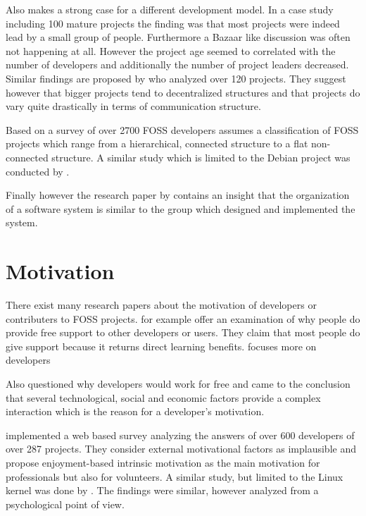 Also \textcite{Krishnamurthy2002} makes a strong case for a different
development model. In a case study including 100 mature projects the finding
was that most projects were indeed lead by a small group of people. Furthermore
a Bazaar like discussion was often not happening at all. However the project
age seemed to correlated with the number of developers and additionally the
number of project leaders decreased. Similar findings are proposed by
\textcite{Crowston2005a} who analyzed over 120 projects. They suggest however
that bigger projects tend to decentralized structures and that projects do vary
quite drastically in terms of communication structure.

Based on a survey of over 2700 \ac{FOSS} developers \textcite{Ghosh2005}
assumes a classification of \ac{FOSS} projects which range from a hierarchical,
connected structure to a flat non-connected structure. A similar study which is
limited to the Debian project was conducted by \textcite{Sadowski2008}.

Finally however the research paper by \textcite{Conway1968} contains an insight
that the organization of a software system is similar to the group which
designed and implemented the system.


\section{Motivation} %

There exist many research papers about the motivation of developers or
contributers to \ac{FOSS} projects. \textcite{Lakhani2002} for example offer an
examination of why people do provide free support to other developers or users.
They claim that most people do give support because it returns direct learning
benefits. \textcite{Lerner2000} focuses more on developers 

Also \textcite{Grazzini2009} questioned why developers would work for free and
came to the conclusion that several technological, social and economic factors
provide a complex interaction which is the reason for a developer's motivation.

\textcite{Lakhani2003} implemented a web based survey analyzing the answers of
over 600 developers of over 287 projects. They consider external motivational
factors as implausible and propose enjoyment-based intrinsic motivation as the
main motivation for professionals but also for volunteers. A similar study, but
limited to the Linux kernel was done by \textcite{Hertel2003}. The findings
were similar, however analyzed from a psychological point of view.

